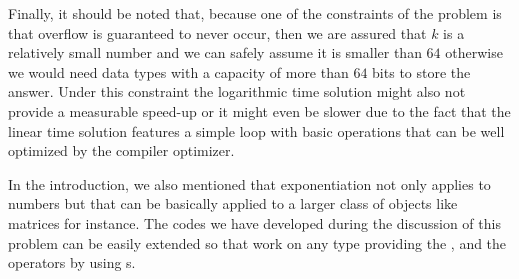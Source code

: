 


Finally, it should be noted that, because one of the constraints of the problem is that overflow is guaranteed to never occur, then we are assured that $k$ is a relatively small number and we can safely assume it is smaller than $64$ otherwise we would need data types with a capacity of more than $64$ bits to store the answer.
Under this constraint the logarithmic time solution might also not provide a measurable speed-up or it might even be slower due to the fact that the linear time solution features a simple loop with basic operations that can be well optimized by the compiler optimizer. 


In the introduction, we also mentioned that exponentiation not only applies to numbers but that can be basically applied to a larger class of objects like matrices for instance. The codes we have developed during the discussion of this problem can be easily extended so that work on any type  providing the , and the
 operators by using s.

